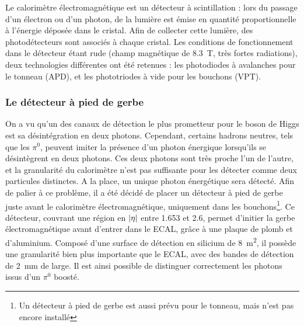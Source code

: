\medskip

Le calorimètre électromagnétique est un détecteur à scintillation : lors du passage d'un électron ou d'un photon, de la lumière est émise en quantité proportionnelle à l'énergie déposée dans le cristal. Afin de collecter cette lumière, des photodétecteurs sont associés à chaque cristal. Les conditions de fonctionnement dans le détecteur étant rude (champ magnétique de \SI{8.3}{\tesla}, très fortes radiations), deux technologies différentes ont été retenues : les photodiodes à avalanches pour le tonneau (APD), et les phototriodes à vide pour les bouchons (VPT).

\subsubsection{Le détecteur à pied de gerbe}

On a vu qu'un des canaux de détection le plus prometteur pour le boson de Higgs est sa désintégration en deux photons. Cependant, certains hadrons neutres, tels que les $\pi^0$, peuvent imiter la présence d'un photon énergique lorsqu'ils se désintègrent en deux photons. Ces deux photons sont très proche l'un de l'autre, et la granularité du calorimètre n'est pas suffisante pour les détecter comme deux particules distinctes. A la place, un unique photon énergétique sera détecté. Afin de palier à ce problème, il a été décidé de placer un détecteur à pied de gerbe juste avant le calorimètre électromagnétique, uniquement dans les bouchons\footnote{Un détecteur à pied de gerbe est aussi prévu pour le tonneau, mais n'est pas encore installé}. Ce détecteur, couvrant une région en $\lvert \eta \rvert$ entre \num{1.653} et \num{2.6}, permet d'initier la gerbe électromagnétique avant d'entrer dans le ECAL, grâce à une plaque de plomb et d'aluminium. Composé d'une surface de détection en silicium de \SI{8}{\square\meter}, il possède une granularité bien plus importante que le ECAL, avec des bandes de détection de \SI{2}{\mm} de large. Il est ainsi possible de distinguer correctement les photons issus d'un $\pi^0$ boosté.

